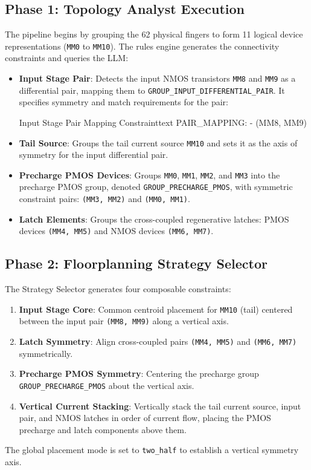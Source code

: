 \subsection{Phase 1: Topology Analyst Execution}
The pipeline begins by grouping the 62 physical fingers to form 11 logical device representations (\texttt{MM0} to \texttt{MM10}). The rules engine generates the connectivity constraints and queries the LLM:
\begin{itemize}
    \item \textbf{Input Stage Pair}: Detects the input NMOS transistors \texttt{MM8} and \texttt{MM9} as a differential pair, mapping them to \texttt{GROUP\_INPUT\_DIFFERENTIAL\_PAIR}. It specifies symmetry and match requirements for the pair:
    \begin{thesiscode}{Input Stage Pair Mapping Constraint}{text}
PAIR_MAPPING:
    - (MM8, MM9)
    \end{thesiscode}
    \item \textbf{Tail Source}: Groups the tail current source \texttt{MM10} and sets it as the axis of symmetry for the input differential pair.
    \item \textbf{Precharge PMOS Devices}: Groups \texttt{MM0}, \texttt{MM1}, \texttt{MM2}, and \texttt{MM3} into the precharge PMOS group, denoted \texttt{GROUP\_}\allowbreak\texttt{PRECHARGE\_}\allowbreak\texttt{PMOS}, with symmetric constraint pairs: \texttt{(MM3, MM2)} and \texttt{(MM0, MM1)}.
    \item \textbf{Latch Elements}: Groups the cross-coupled regenerative latches: PMOS devices \texttt{(MM4, MM5)} and NMOS devices \texttt{(MM6, MM7)}.
\end{itemize}

\subsection{Phase 2: Floorplanning Strategy Selector}
The Strategy Selector generates four composable constraints:
\begin{enumerate}
    \item \textbf{Input Stage Core}: Common centroid placement for \texttt{MM10} (tail) centered between the input pair \texttt{(MM8, MM9)} along a vertical axis.
    \item \textbf{Latch Symmetry}: Align cross-coupled pairs \texttt{(MM4, MM5)} and \texttt{(MM6, MM7)} symmetrically.
    \item \textbf{Precharge PMOS Symmetry}: Centering the precharge group \texttt{GROUP\_}\allowbreak\texttt{PRECHARGE\_}\allowbreak\texttt{PMOS} about the vertical axis.
    \item \textbf{Vertical Current Stacking}: Vertically stack the tail current source, input pair, and NMOS latches in order of current flow, placing the PMOS precharge and latch components above them.
\end{enumerate}
The global placement mode is set to \texttt{two\_half} to establish a vertical symmetry axis.

